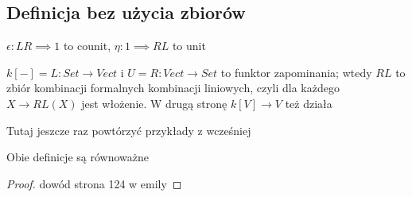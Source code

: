 \subsection{Definicja bez użycia zbiorów}

\begin{definition}{}{}
$\epsilon:LR\implies 1$ to counit, $\eta:1\implies RL$ to unit
  
  \begin{center}
  \end{center}
  \begin{center}
  \end{center}
\end{definition}

$k[-]=L:Set\to Vect$ i $U=R:Vect\to Set$ to funktor zapominania; wtedy $RL$ to zbiór kombinacji formalnych kombinacji liniowych, czyli dla każdego $X\to RL(X)$ jest włożenie. W drugą stronę $k[V]\to V$ też działa

Tutaj jeszcze raz powtórzyć przykłady z wcześniej


\begin{theorem}{}{}
  Obie definicje są równoważne
\end{theorem}

\begin{proof}
  dowód strona 124 w emily
\end{proof}



